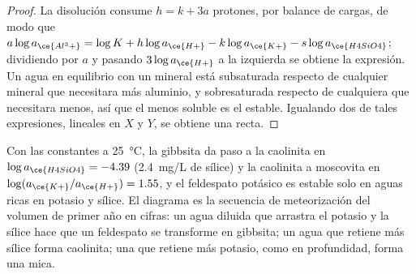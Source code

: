\begin{proof}
La disolución consume $h = k + 3a$ protones, por balance de cargas, de modo que $a\log
a_{\ce{Al^3+}} = \log K + h\log a_{\ce{H+}} - k\log a_{\ce{K+}} - s\log
a_{\ce{H4SiO4}}$; dividiendo por $a$ y pasando $3\log a_{\ce{H+}}$ a la izquierda
se obtiene la expresión. Un agua en equilibrio con un mineral está
subsaturada respecto de cualquier mineral que necesitara más aluminio, y
sobresaturada respecto de cualquiera que necesitara menos, así que el menos soluble es
el estable. Igualando dos de tales expresiones, lineales en $X$ y $Y$, se obtiene una recta.
\end{proof}

Con las constantes a \qty{25}{\celsius}, la gibbsita da paso a la caolinita en
$\log a_{\ce{H4SiO4}} = -4.39$ (\qty{2.4}{mg/L} de sílice) y la caolinita a
moscovita en $\log(a_{\ce{K+}}/a_{\ce{H+}}) = 1.55$, y el feldespato potásico es estable
solo en aguas ricas en potasio y sílice. El diagrama es la secuencia de meteorización
del volumen de primer año en cifras: un agua diluida que arrastra
el potasio y la sílice hace que un feldespato se transforme en gibbsita; un agua que
retiene más sílice forma caolinita; una que retiene más potasio, como en profundidad,
forma una mica.

